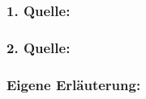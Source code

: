        \subsubsection*{1. Quelle:}
        \begin{abstract}
        \end{abstract}
        \subsubsection*{2. Quelle:}
        \begin{abstract}
        \end{abstract}
        \subsubsection*{Eigene Erläuterung:}
        \begin{abstract}
        \end{abstract}